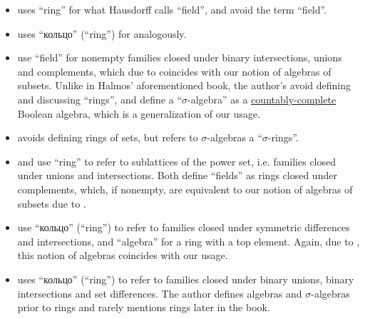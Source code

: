 \begin{remark}
\begin{itemize}
    \item {} uses \enquote{ring} for what Hausdorff calls \enquote{field}, and avoid the term \enquote{field}.

    \item {} uses \enquote{кольцо} (\enquote{ring}) for analogously.

    \item {} use \enquote{field} for nonempty families closed under binary intersections, unions and complements, which due to  coincides with our notion of algebras of subsets. Unlike in Halmos' aforementioned book, the author's avoid defining and discussing \enquote{rings}, and define a \enquote{\( \sigma \)-algebra} as a \hyperref[def:countably_complete_lattice]{countably-complete} Boolean algebra, which is a generalization of our usage.

    \item {} avoids defining rings of sets, but refers to \( \sigma \)-algebras a \enquote{\( \sigma \)-rings}.

    \item {} and  use \enquote{ring} to refer to sublattices of the power set, i.e. families closed under unions and intersections. Both define \enquote{fields} as rings closed under complements, which, if nonempty, are equivalent to our notion of algebras of subsets due to .

    \item {} use \enquote{кольцо} (\enquote{ring}) to refer to families closed under symmetric differences and intersections, and \enquote{algebra} for a ring with a top element. Again, due to , this notion of algebras coincides with our usage.

    \item {} uses \enquote{кольцо} (\enquote{ring}) to refer to families closed under binary unions, binary intersections and set differences. The author defines algebras and \( \sigma \)-algebras prior to rings and rarely mentions rings later in the book.
  \end{itemize}
\end{remark}
